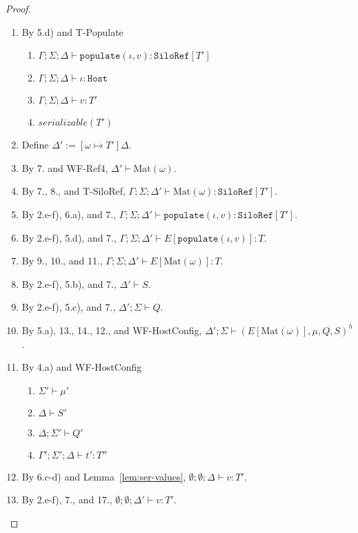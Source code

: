 \documentclass{article}
\theoremstyle{definition}
\begin{document}
\begin{proof}
\begin{itemize}
\begin{enumerate}
\begin{enumerate}[label=(\alph*)]
  \end{enumerate}
\item By 5.d) and T-Populate
  \begin{enumerate}[label=(\alph*)]
  \item $\Gamma ; \Sigma ; \Delta \vdash \texttt{populate}(\iota, v) : \texttt{SiloRef}[T']$
  \item $\Gamma ; \Sigma ; \Delta \vdash \iota : \texttt{Host}$
  \item $\Gamma ; \Sigma ; \Delta \vdash v : T'$
  \item $serializable(T')$
  \end{enumerate}
\item Define $\Delta' := [\omega \mapsto T']\Delta$.
\item By 7. and WF-Ref4, $\Delta' \vdash \text{Mat}(\omega)$.
\item By 7., 8., and T-SiloRef, $\Gamma ; \Sigma ; \Delta' \vdash \text{Mat}(\omega) : \texttt{SiloRef}[T']$.
\item By 2.e-f), 6.a), and 7., $\Gamma ; \Sigma ; \Delta' \vdash \texttt{populate}(\iota, v) : \texttt{SiloRef}[T']$.
\item By 2.e-f), 5.d), and 7., $\Gamma ; \Sigma ; \Delta' \vdash E[\texttt{populate}(\iota, v)] : T$.
\item By 9., 10., and 11., $\Gamma ; \Sigma ; \Delta' \vdash E[\text{Mat}(\omega)] : T$.
\item By 2.e-f), 5.b), and 7., $\Delta' \vdash S$.
\item By 2.e-f), 5.c), and 7., $\Delta' ; \Sigma \vdash Q$.
\item By 5.a), 13., 14., 12., and WF-HostConfig, $\Delta' ; \Sigma \vdash (E[\text{Mat}(\omega)], \mu, Q, S)^h$.
\item By 4.a) and WF-HostConfig
  \begin{enumerate}[label=(\alph*)]
  \item $\Sigma' \vdash \mu'$
  \item $\Delta \vdash S'$
  \item $\Delta ; \Sigma' \vdash Q'$
  \item $\Gamma' ; \Sigma' ; \Delta \vdash t' : T''$
  \end{enumerate}
\item By 6.c-d) and Lemma~\ref{lem:ser-values}, $\emptyset ; \emptyset ; \Delta \vdash v : T'$.
\item By 2.e-f), 7., and 17., $\emptyset ; \emptyset ; \Delta' \vdash v : T'$.

\end{enumerate}
\end{itemize}
\end{proof}
\end{document}
